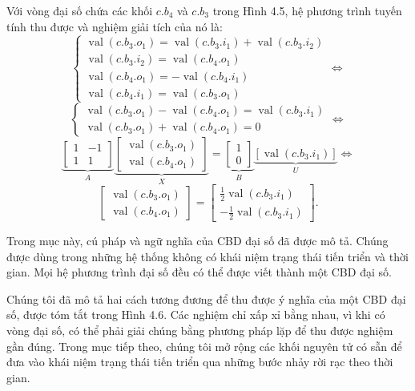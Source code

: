 Với vòng đại số chứa các khối $c.b_4$ và $c.b_3$ trong Hình 4.5, hệ phương trình tuyến tính thu được và nghiệm giải tích của nó là:
\[
\begin{cases}
\operatorname{val}(c.b_3.o_1)=\operatorname{val}(c.b_3.i_1)+\operatorname{val}(c.b_3.i_2)\\
\operatorname{val}(c.b_3.i_2)=\operatorname{val}(c.b_4.o_1)\\
\operatorname{val}(c.b_4.o_1)=-\operatorname{val}(c.b_4.i_1)\\
\operatorname{val}(c.b_4.i_1)=\operatorname{val}(c.b_3.o_1)
\end{cases}\Longleftrightarrow
\]
\[
\begin{cases}
\operatorname{val}(c.b_3.o_1)-\operatorname{val}(c.b_4.o_1)=\operatorname{val}(c.b_3.i_1)\\
\operatorname{val}(c.b_3.o_1)+\operatorname{val}(c.b_4.o_1)=0
\end{cases}\Longleftrightarrow
\]
\[
\underbrace{\begin{bmatrix}1&-1\\1&1\end{bmatrix}}_A
\underbrace{\begin{bmatrix}\operatorname{val}(c.b_3.o_1)\\\operatorname{val}(c.b_4.o_1)\end{bmatrix}}_X
=\underbrace{\begin{bmatrix}1\\0\end{bmatrix}}_B
\underbrace{[\operatorname{val}(c.b_3.i_1)]}_U\Longleftrightarrow
\]
\[
\begin{bmatrix}\operatorname{val}(c.b_3.o_1)\\\operatorname{val}(c.b_4.o_1)\end{bmatrix}
=\begin{bmatrix}\frac12\operatorname{val}(c.b_3.i_1)\\-\frac12\operatorname{val}(c.b_3.i_1)\end{bmatrix}.
\]

Trong mục này, cú pháp và ngữ nghĩa của CBD đại số đã được mô tả. Chúng được dùng trong những hệ thống không có khái niệm trạng thái tiến triển và thời gian. Mọi hệ phương trình đại số đều có thể được viết thành một CBD đại số.

Chúng tôi đã mô tả hai cách tương đương để thu được ý nghĩa của một CBD đại số, được tóm tắt trong Hình 4.6. Các nghiệm chỉ xấp xỉ bằng nhau, vì khi có vòng đại số, có thể phải giải chúng bằng phương pháp lặp để thu được nghiệm gần đúng.
Trong mục tiếp theo, chúng tôi mở rộng các khối nguyên tử có sẵn để đưa vào khái niệm trạng thái tiến triển qua những bước nhảy rời rạc theo thời gian.

